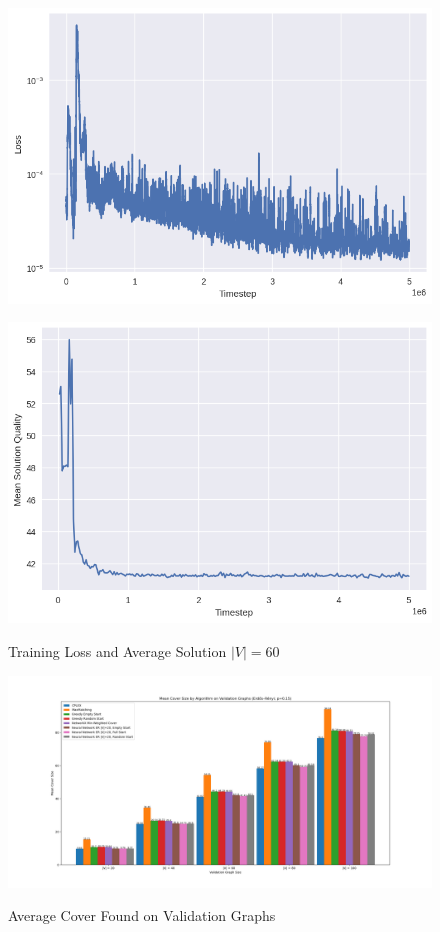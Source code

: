 \documentclass{article}
\begin{document}
\begin{figure}[ht]
    \caption{Training Loss and Average Solution $|V| = 60$}
    \centering
    \includegraphics[scale=0.5]{../ER_60spin/eco/min_cover/network/loss.png}

    \includegraphics[scale=0.5]{../ER_60spin/eco/min_cover/network/training_curve.png}
    \label{fig:training-mvc-60}
\end{figure}

\begin{figure}
    \caption{Average Cover Found on Validation Graphs}
    \centering
    \includegraphics[scale=0.2]{../test20.png}
    \label{fig:test-20}
\end{figure}

\clearpage


\end{document}
